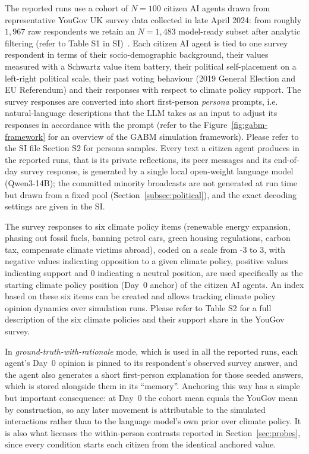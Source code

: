 \documentclass[pdflatex,sn-mathphys-num]{sn-jnl}%
\theoremstyle{thmstyleone}%
\theoremstyle{thmstyletwo}%
\theoremstyle{thmstylethree}%
\begin{document}
The reported runs use a cohort of $N=100$ citizen AI agents drawn from representative
YouGov UK survey data collected in late April 2024: from roughly $1{,}967$ raw
respondents we retain an $N=1{,}483$ model-ready subset after analytic filtering (refer
to Table S1 in SI)~\cite{spaiser2024survey}. Each citizen AI agent is tied to one survey respondent in
terms of their socio-demographic background, their values measured with a Schwartz value
item battery, their political self-placement on a left-right political scale, their past
voting behaviour (2019 General Election and EU Referendum) and their responses with
respect to climate policy support. The survey responses are converted into short
first-person \emph{persona} prompts, i.e. natural-language descriptions that the
LLM takes as an input to adjust its responses in accordance with the prompt (refer to
the Figure~\ref{fig:gabm-framework} for an overview of the GABM simulation framework).
Please refer to the SI file Section S2 for persona samples. Every text a citizen agent
produces in the reported runs, that is its private reflections, its peer messages and its
end-of-day survey response, is generated by a single local open-weight language model
(Qwen3-14B); the committed minority broadcasts are not generated at run time but drawn
from a fixed pool (Section~\ref{subsec:political}), and the exact decoding settings are
given in the SI.

The survey responses to six climate policy items (renewable energy expansion, phasing
out fossil fuels, banning petrol cars, green housing regulations, carbon tax, compensate
climate victims abroad), coded on a scale from -3 to 3, with negative values indicating
opposition to a given climate policy, positive values indicating support and 0
indicating a neutral position, are used specifically as the starting climate policy
position (Day~0 anchor) of the citizen AI agents. An index based on these six items can
be created and allows tracking climate policy opinion dynamics over simulation runs.
Please refer to Table S2 for a full description of the six climate policies and their
support share in the YouGov survey.

In \emph{ground-truth-with-rationale} mode, which is used in all the reported runs, each
agent's Day~0 opinion is pinned to its respondent's observed survey answer, and the agent
also generates a short first-person explanation for those seeded answers, which is stored
alongside them in its ``memory''. Anchoring this way has a simple but important
consequence: at Day~0 the cohort mean equals the YouGov mean by construction, so any
later movement is attributable to the simulated interactions rather than to the language
model's own prior over climate policy. It is also what licenses the within-person
contrasts reported in Section~\ref{sec:probes}, since every condition starts each citizen
from the identical anchored value.
\end{document}
